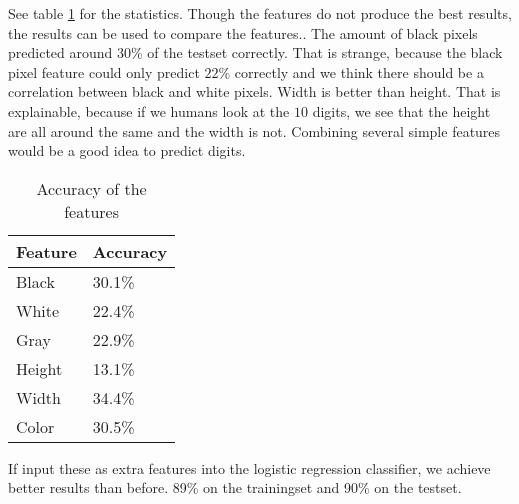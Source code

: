 \documentclass{article}
\begin{document}
See table \ref{tab:accuracy} for the statistics. Though the features do not produce the best results, the results can be used to compare the features.. The amount of black pixels predicted around $30$\% of the testset correctly. That is strange, because the black pixel feature could only predict $22$\%  correctly and we think there should be a correlation between black and white pixels. Width is better than height. That is explainable, because if we humans look at the $10$ digits, we see that the height are all around the same and the width is not. Combining several simple features would be a good idea to predict digits. 

\begin{table}[H]
	\begin{center}
	\begin{tabular}{l|l}
		Feature & Accuracy \\
		\hline
		Black & 30.1\% \\
		White & 22.4\% \\
		Gray & 22.9\% \\
		Height & 13.1\% \\
		Width & 34.4\% \\
		Color & 30.5\% \\
	\end{tabular}
	\end{center}	
	\caption{Accuracy of the features}
	\label{tab:accuracy}
\end{table}

If input these as extra features into the logistic regression classifier, we achieve better results than before. 89\% on the trainingset and 90\% on the testset.
\end{document}
